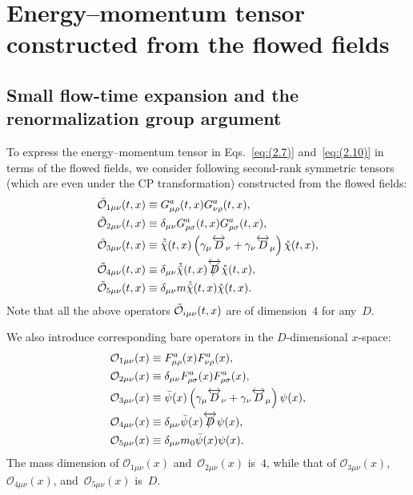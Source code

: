 \section{Energy--momentum tensor constructed from the flowed
fields}
\label{sec:4}
\subsection{Small flow-time expansion and the renormalization group
argument}
To express the energy--momentum tensor in Eqs.~\eqref{eq:(2.7)}
and~\eqref{eq:(2.10)} in terms of the flowed fields, we consider following
second-rank symmetric tensors (which are even under the CP transformation)
constructed from the flowed fields:
\begin{align}
   \Tilde{\mathcal{O}}_{1\mu\nu}(t,x)&\equiv
   G_{\mu\rho}^a(t,x)G_{\nu\rho}^a(t,x),
\label{eq:(4.1)}\\
   \Tilde{\mathcal{O}}_{2\mu\nu}(t,x)&\equiv
   \delta_{\mu\nu}G_{\rho\sigma}^a(t,x)G_{\rho\sigma}^a(t,x),
\label{eq:(4.2)}\\
   \Tilde{\mathcal{O}}_{3\mu\nu}(t,x)&\equiv
   \mathring{\Bar{\chi}}(t,x)
   \left(\gamma_\mu\overleftrightarrow{D}_\nu
   +\gamma_\nu\overleftrightarrow{D}_\mu\right)
   \mathring{\chi}(t,x),
\label{eq:(4.3)}\\
   \Tilde{\mathcal{O}}_{4\mu\nu}(t,x)&\equiv
   \delta_{\mu\nu}
   \mathring{\Bar{\chi}}(t,x)
   \overleftrightarrow{\Slash{D}}
   \mathring{\chi}(t,x),
\label{eq:(4.4)}\\
   \Tilde{\mathcal{O}}_{5\mu\nu}(t,x)&\equiv
   \delta_{\mu\nu}
   m\mathring{\Bar{\chi}}(t,x)
   \mathring{\chi}(t,x).
\label{eq:(4.5)}
\end{align}
Note that all the above operators $\Tilde{\mathcal{O}}_{i\mu\nu}(t,x)$ are of
dimension~$4$ for any~$D$.

We also introduce corresponding bare operators in the $D$-dimensional
$x$-space:
\begin{align}
   \mathcal{O}_{1\mu\nu}(x)&\equiv
   F_{\mu\rho}^a(x)F_{\nu\rho}^a(x),
\label{eq:(4.6)}\\
   \mathcal{O}_{2\mu\nu}(x)&\equiv
   \delta_{\mu\nu}F_{\rho\sigma}^a(x)F_{\rho\sigma}^a(x),
\label{eq:(4.7)}\\
   \mathcal{O}_{3\mu\nu}(x)&\equiv
   \Bar{\psi}(x)
   \left(\gamma_\mu\overleftrightarrow{D}_\nu
   +\gamma_\nu\overleftrightarrow{D}_\mu\right)
   \psi(x),
\label{eq:(4.8)}\\
   \mathcal{O}_{4\mu\nu}(x)&\equiv
   \delta_{\mu\nu}
   \Bar{\psi}(x)
   \overleftrightarrow{\Slash{D}}
   \psi(x),
\label{eq:(4.9)}\\
   \mathcal{O}_{5\mu\nu}(x)&\equiv
   \delta_{\mu\nu}
   m_0\Bar{\psi}(x)
   \psi(x).
\label{eq:(4.10)}
\end{align}
The mass dimension of $\mathcal{O}_{1\mu\nu}(x)$ and~$\mathcal{O}_{2\mu\nu}(x)$
is~$4$, while that of $\mathcal{O}_{3\mu\nu}(x)$, $\mathcal{O}_{4\mu\nu}(x)$,
and~$\mathcal{O}_{5\mu\nu}(x)$ is~$D$.

